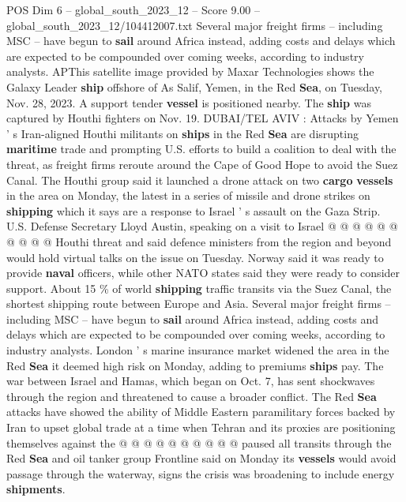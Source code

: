 \begin{textsample}{POS Dim 6 – global\_south\_2023\_12 – Score 9.00 – global\_south\_2023\_12/104412007.txt}  \label{ex:f6_pos_123}
Several major freight firms -- including MSC -- have begun to \textbf{sail} around Africa instead, adding costs and delays which are expected to be compounded over coming weeks, according to industry analysts.
APThis satellite image provided by Maxar Technologies shows the Galaxy Leader \textbf{ship} offshore of As Salif, Yemen, in the Red \textbf{Sea}, on Tuesday, Nov. 28, 2023.
A support tender \textbf{vessel} is positioned nearby.
The \textbf{ship} was captured by Houthi fighters on Nov. 19.
DUBAI/TEL AVIV : Attacks by Yemen ' s Iran-aligned Houthi militants on \textbf{ships} in the Red \textbf{Sea} are disrupting \textbf{maritime} trade and prompting U.S. efforts to build a coalition to deal with the threat, as freight firms reroute around the Cape of Good Hope to avoid the Suez Canal.
The Houthi group said it launched a drone attack on two \textbf{cargo} \textbf{vessels} in the area on Monday, the latest in a series of missile and drone strikes on \textbf{shipping} which it says are a response to Israel ' s assault on the Gaza Strip.
U.S.
Defense Secretary Lloyd Austin, speaking on a visit to Israel @ @ @ @ @ @ @ @ @ @ Houthi threat and said defence ministers from the region and beyond would hold virtual talks on the issue on Tuesday.
Norway said it was ready to provide \textbf{naval} officers, while other NATO states said they were ready to consider support.
About 15 \% of world \textbf{shipping} traffic transits via the Suez Canal, the shortest shipping route between Europe and Asia.
Several major freight firms -- including MSC -- have begun to \textbf{sail} around Africa instead, adding costs and delays which are expected to be compounded over coming weeks, according to industry analysts.
London ' s marine insurance market widened the area in the Red \textbf{Sea} it deemed high risk on Monday, adding to premiums \textbf{ships} pay.
The war between Israel and Hamas, which began on Oct. 7, has sent shockwaves through the region and threatened to cause a broader conflict.
The Red \textbf{Sea} attacks have showed the ability of Middle Eastern paramilitary forces backed by Iran to upset global trade at a time when Tehran and its proxies are positioning themselves against the @ @ @ @ @ @ @ @ @ @ paused all transits through the Red \textbf{Sea} and oil tanker group Frontline said on Monday its \textbf{vessels} would avoid passage through the waterway, signs the crisis was broadening to include energy \textbf{shipments}.

\end{textsample}
